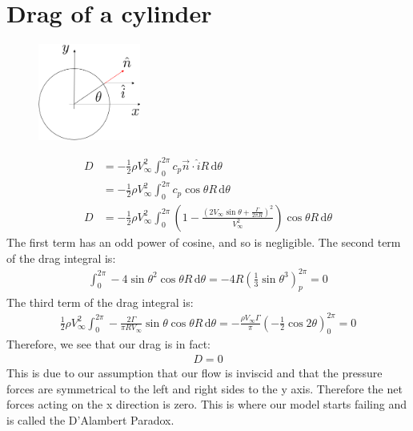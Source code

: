 \documentclass[class=report, crop=false, 12pt,a4paper]{standalone}
\begin{document}
\section{Drag of a cylinder}
\begin{figure}[H]
  \centering
  \includegraphics[width = 0.3\textwidth]{../img/diagram27.png}
\end{figure}
\begin{align}
  D &= -\frac{1}{2} \rho V_\infty^2 \int_{0}^{2\pi} c_p \vec{n}\cdot\hat{i} R \,\mathrm{d}\theta\\
  &= - \frac{1}{2} \rho V_\infty^2 \int_{0}^{2\pi} c_p \cos{\theta} R \,\mathrm{d}\theta \\
  D &= - \frac{1}{2} \rho V_\infty^2 \int_{0}^{2\pi} \left(1 - \frac{\left(2V_\infty \sin{\theta} + \frac{\Gamma}{2\pi R}\right)^2}{V_\infty^2}\right)\cos{\theta} R \,\mathrm{d}\theta 
\end{align}
The first term has an odd power of cosine, and so is negligible. The second term of the drag integral is:
\begin{align}
  \int_{0}^{2\pi} -4\sin{\theta}^2 \cos{\theta} R \,\mathrm{d}\theta = -4R \left(\frac{1}{3} \sin{\theta}^3\right)_p^{2\pi} = 0 
\end{align}
The third term of the drag integral is:
\begin{align}
  \frac{1}{2}\rho V_\infty^2 \int_{0}^{2\pi} -\frac{2\Gamma}{\pi R V_\infty}\sin{\theta}\cos{\theta} R \,\mathrm{d}\theta = - \frac{\rho V_\infty \Gamma}{\pi} \left(-\frac{1}{2} \cos{2\theta}\right)_0^{2\pi} = 0
\end{align}
Therefore, we see that our drag is in fact:
\begin{align}
  D = 0
\end{align}
This is due to our assumption that our flow is inviscid and that the pressure forces are symmetrical to the left and right sides to the y axis. Therefore the net forces acting on the x direction is zero. This is where our model starts failing and is called the D'Alambert Paradox.
\end{document}

